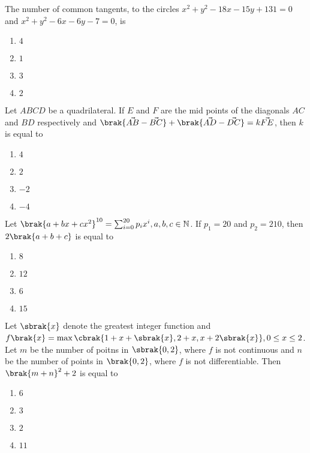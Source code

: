     \item The number of common tangents, to the circles $x^2 + y^2 - 18x - 15y + 131 = 0$ and $x^2 + y^2  - 6x - 6y - 7 = 0$, is
    \hfill{}

	\begin{enumerate}
		\item $4$ 
		\item $1$
		\item $3$
		\item $2$
	\end{enumerate}

    \item Let $ABCD$ be a quadrilateral. If $E$ and $F$ are the mid points of the diagonals $AC$ and $BD$ respectively and $\brak{\vec{AB} - \vec{BC}} + \brak{\vec{AD} - \vec{DC}} = k\vec{FE}$, then $k$ is equal to 
    \hfill{}

	\begin{enumerate}
		\item $4$
		\item $2$
		\item $-2$
		\item $-4$
	\end{enumerate}

    \item Let $\brak{a + bx + cx^2}^{10} = \sum_{i = 0}^{20} p_{i} x^{i}, a, b, c \in \mathbb{N}$. If $p_1 = 20$ and $p_2 = 210$, then $2\brak{a + b + c}$ is equal to
    \hfill{}

	\begin{enumerate}
		\item $8$
		\item $12$
		\item $6$
		\item $15$
	\end{enumerate}

    \item Let $\sbrak{x}$ denote the greatest integer function and $f\brak{x} = \max\cbrak{1 + x + \sbrak{x}, 2 + x, x + 2\sbrak{x}}, 0 \leq x \leq 2$. Let $m$ be the number of poitns in $\sbrak{0, 2}$, where $f$ is not continuous and $n$ be the number of points in $\brak{0, 2}$, where $f$ is not differentiable. Then $\brak{m + n}^2 + 2$ is equal to
    \hfill{}

	\begin{enumerate}
		\item $6$ 
		\item $3$ 
		\item $2$ 
		\item $11$ 
	\end{enumerate}

